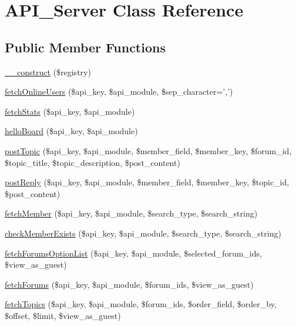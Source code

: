 \hypertarget{class_a_p_i___server}{\section{A\-P\-I\-\_\-\-Server Class Reference}
\label{class_a_p_i___server}
}
\subsection*{Public Member Functions}
\begin{DoxyCompactItemize}
\item 
\hyperlink{class_a_p_i___server_a9bca9e7526df8937db1e2b31cabae7d2}{\-\_\-\-\_\-construct} (\$registry)
\item 
\hyperlink{class_a_p_i___server_a220d226690bfe0f7ba0a30c5cca12627}{fetch\-Online\-Users} (\$api\-\_\-key, \$api\-\_\-module, \$sep\-\_\-character=',')
\item 
\hyperlink{class_a_p_i___server_af807de79b9c9a202e8f3811c9d21cab3}{fetch\-Stats} (\$api\-\_\-key, \$api\-\_\-module)
\item 
\hyperlink{class_a_p_i___server_ab36cf374af99b58bc7e41674c880e66e}{hello\-Board} (\$api\-\_\-key, \$api\-\_\-module)
\item 
\hyperlink{class_a_p_i___server_a568da3a1f85ecb95d4a1c3d16de42c8d}{post\-Topic} (\$api\-\_\-key, \$api\-\_\-module, \$member\-\_\-field, \$member\-\_\-key, \$forum\-\_\-id, \$topic\-\_\-title, \$topic\-\_\-description, \$post\-\_\-content)
\item 
\hyperlink{class_a_p_i___server_ac81442838cc9e84f90efd76c25cfc939}{post\-Reply} (\$api\-\_\-key, \$api\-\_\-module, \$member\-\_\-field, \$member\-\_\-key, \$topic\-\_\-id, \$post\-\_\-content)
\item 
\hyperlink{class_a_p_i___server_adadc4c1820b0c6b49dd42aeddcb2bdc5}{fetch\-Member} (\$api\-\_\-key, \$api\-\_\-module, \$search\-\_\-type, \$search\-\_\-string)
\item 
\hyperlink{class_a_p_i___server_a7aaa8f0f01dee55528f70508aca439ad}{check\-Member\-Exists} (\$api\-\_\-key, \$api\-\_\-module, \$search\-\_\-type, \$search\-\_\-string)
\item 
\hyperlink{class_a_p_i___server_a824c00f5fdd34fcedc193568af003f37}{fetch\-Forums\-Option\-List} (\$api\-\_\-key, \$api\-\_\-module, \$selected\-\_\-forum\-\_\-ids, \$view\-\_\-as\-\_\-guest)
\item 
\hyperlink{class_a_p_i___server_aeec29abd72a8f86912c9d0350c9c16cb}{fetch\-Forums} (\$api\-\_\-key, \$api\-\_\-module, \$forum\-\_\-ids, \$view\-\_\-as\-\_\-guest)
\item 
\hyperlink{class_a_p_i___server_a5b98466477244e5a8622bf3eff838df9}{fetch\-Topics} (\$api\-\_\-key, \$api\-\_\-module, \$forum\-\_\-ids, \$order\-\_\-field, \$order\-\_\-by, \$offset, \$limit, \$view\-\_\-as\-\_\-guest)
\end{DoxyCompactItemize}
